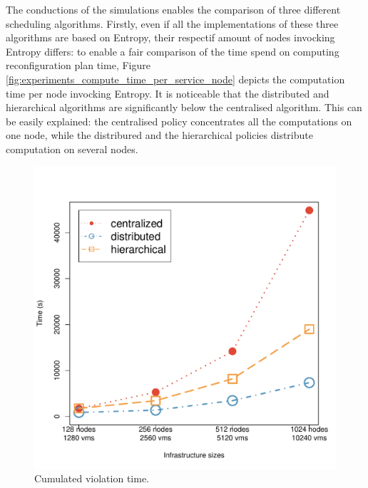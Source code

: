 The conductions of the simulations enables the comparison of three different 
scheduling algorithms. Firstly, even if all the implementations of these three 
algorithms are based on Entropy, their respectif amount of nodes invocking 
Entropy differs: to enable a fair comparison of the time spend on computing 
reconfiguration plan time, 
Figure \ref{fig:experiments_compute_time_per_service_node} depicts the 
computation time per node invocking Entropy. It is noticeable that the 
distributed and hierarchical algorithms are significantly below the centralised
algorithm. This can be easily explained: the centralised policy concentrates all
the computations on one node, while the distribured and the hierarchical 
policies distribute computation on several nodes.

\begin{figure}[ht]
\begin{center}
    \includegraphics[width=.65\linewidth]{figures/experiments/violation_time.pdf}
    \caption{Cumulated violation time.}
\end{center}
\label{fig:experiments_violation_time}
\end{figure}


